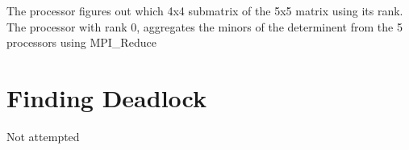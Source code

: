 \documentclass[a4paper]{article}
\begin{document}
The processor figures out which 4x4 submatrix of the 5x5 matrix using its rank. The processor with rank 0, aggregates the minors of the determinent from the 5 processors using MPI\_Reduce




\newpage
\section{Finding Deadlock}

Not attempted
\end{document}
